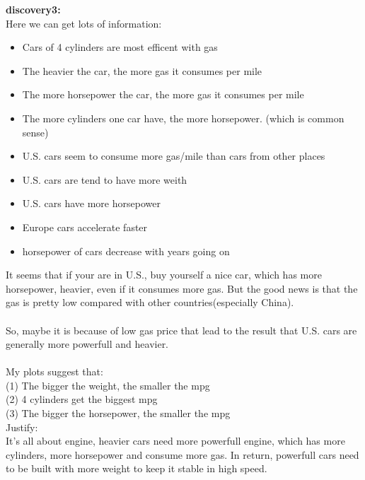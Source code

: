 \documentclass[a4paper]{article}
\begin{document}
\begin{enumerate}
{
\colorbox{BurntOrange}{\textbf{discovery3:}}\color{red}\\
Here we can get lots of information:
\begin{itemize}
\item Cars of 4 cylinders are most efficent with gas
\item The heavier the car, the more gas it consumes per mile
\item The more horsepower the car, the more gas it consumes per mile
\item The more cylinders one car have, the more horsepower. (which is common sense)
\item U.S. cars seem to consume more gas/mile than cars from other places
\item U.S. cars are tend to have more weith
\item U.S. cars have more horsepower
\item Europe cars accelerate faster
\item horsepower of cars decrease with years going on
\end{itemize}

It seems that if your are in U.S., buy yourself a nice car, which has more horsepower, heavier, even if it consumes more gas. But the good news is that the gas is pretty low compared with other countries(especially China).\\
\\
So, maybe it is because of low gas price that lead to the result that U.S. cars are generally more powerfull and heavier.\\
\\
My plots suggest that:\\
(1) The bigger the weight, the smaller the mpg\\
(2) 4 cylinders get the biggest mpg\\
(3) The bigger the horsepower, the smaller the mpg\\
Justify:\\
It's all about engine, heavier cars need more powerfull engine, which has more cylinders, more horsepower and consume more gas. In return, powerfull cars need to be built with more weight to keep it stable in high speed.
}

\end{enumerate}
\end{document}
